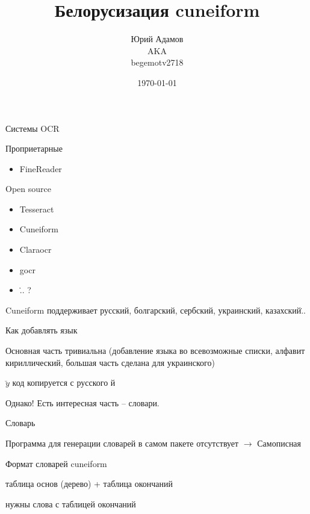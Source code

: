 \documentclass{beamer}
\begin{document}
\title{Белорусизация cuneiform}
\author{Юрий Адамов \\ AKA \\ begemotv2718}
\date{\today}
\frame{\titlepage}
\begin{frame}{Системы OCR}
\begin{block}{Проприетарные}
\begin{itemize}
\item FineReader
\end{itemize}
\end{block}

\begin{block}{Open source}

\begin{itemize}
\item Tesseract
\item Cuneiform
\item Claraocr
\item gocr
\item \... ?
\end{itemize}
\end{block}
\pause
\begin{block}{Cuneiform}
поддерживает русский, болгарский, сербский, украинский, казахский\...
\end{block}
\end{frame}

\begin{frame}{Как добавлять язык}

\begin{block}{Основная часть} 
тривиальна (добавление языка во всевозможные списки, алфавит кириллический, большая часть сделана для украинского)
\end{block}

\begin{block}{\Large $\breve{y}$} 
 код копируется с русского {\Large й}
\end{block}

\begin{block}{Однако!}
 Есть интересная часть -- словари.
\end{block}
\end{frame}


\begin{frame}{Словарь}
\begin{block}{Программа для генерации словарей}
в самом пакете отсутствует $\to$ Самописная


\end{block}
	
\begin{block}{Формат словарей cuneiform} 

 таблица основ (дерево) + таблица окончаний
\end{block}

\begin{block}{}
нужны слова с таблицей окончаний
\end{block}

\end{frame}
\end{document}
